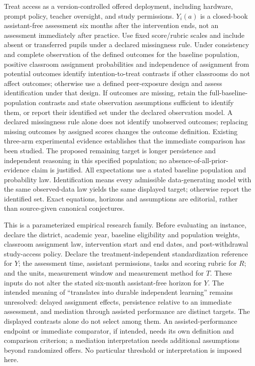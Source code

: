 \documentclass[11pt,a4paper]{article}
\begin{document}
Treat access as a version-controlled offered deployment, including hardware, prompt policy, teacher oversight, and study permissions. \(Y_i(a)\) is a closed-book assistant-free assessment six months after the intervention ends, not an assessment immediately after practice. Use fixed score/rubric scales and include absent or transferred pupils under a declared missingness rule. Under consistency and complete observation of the defined outcomes for the baseline population, positive classroom assignment probabilities and independence of assignment from potential outcomes identify intention-to-treat contrasts if other classrooms do not affect outcomes; otherwise use a defined peer-exposure design and assess identification under that design. If outcomes are missing, retain the full-baseline-population contrasts and state observation assumptions sufficient to identify them, or report their identified set under the declared observation model. A declared missingness rule alone does not identify unobserved outcomes; replacing missing outcomes by assigned scores changes the outcome definition. Existing three-arm experimental evidence establishes that the immediate comparison has been studied. The proposed remaining target is longer persistence and independent reasoning in this specified population; no absence-of-all-prior-evidence claim is justified. All expectations use a stated baseline population and probability law. Identification means every admissible data-generating model with the same observed-data law yields the same displayed target; otherwise report the identified set. Exact equations, horizons and assumptions are editorial, rather than source-given canonical conjectures.

This is a parameterized empirical research family. Before evaluating an instance, declare the district, academic year, baseline eligibility and population weights, classroom assignment law, intervention start and end dates, and post-withdrawal study-access policy. Declare the treatment-independent standardization reference for \(Y\); the assessment time, assistant permissions, tasks and scoring rubric for \(R\); and the units, measurement window and measurement method for \(T\). These inputs do not alter the stated six-month assistant-free horizon for \(Y\). The intended meaning of ``translates into durable independent learning'' remains unresolved: delayed assignment effects, persistence relative to an immediate assessment, and mediation through assisted performance are distinct targets. The displayed contrasts alone do not select among them. An assisted-performance endpoint or immediate comparator, if intended, needs its own definition and comparison criterion; a mediation interpretation needs additional assumptions beyond randomized offers. No particular threshold or interpretation is imposed here.
\end{document}
